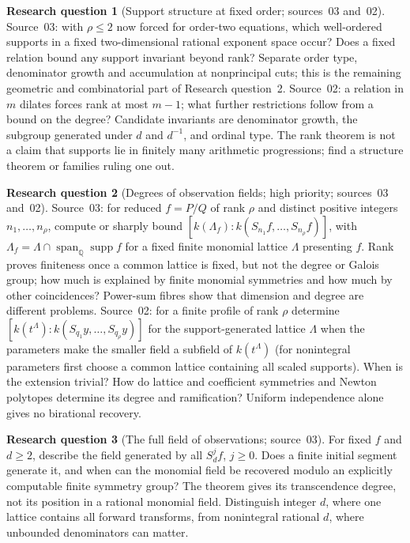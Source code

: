 \documentclass[11pt,letterpaper]{article}
\numberwithin{equation}{section}
\theoremstyle{definition}
\newtheorem{question}{Research question}
\theoremstyle{remark}
\newcommand{\Q}{\mathbb Q}
\newcommand{\supp}{\operatorname{supp}}
\begin{document}
\begin{question}[Support structure at fixed order; sources~03 and~02]
Source~03: with $\rho\le2$ now forced for order-two equations, which
well-ordered supports in a fixed two-dimensional rational exponent space occur?
Does a fixed relation bound any support invariant beyond rank? Separate order
type, denominator growth and accumulation at nonprincipal cuts; this is the
remaining geometric and combinatorial part of Research question~2. Source~02: a
relation in $m$ dilates forces rank at most $m-1$; what further restrictions
follow from a bound on the degree? Candidate invariants are denominator growth,
the subgroup generated under $d$ and $d^{-1}$, and ordinal type. The rank
theorem is not a claim that supports lie in finitely many arithmetic
progressions; find a structure theorem or families ruling one out.
\end{question}

\begin{question}[Degrees of observation fields; high priority; sources~03 and~02]
Source~03: for reduced $f=P/Q$ of rank $\rho$ and distinct positive integers
$n_1,\ldots,n_\rho$, compute or sharply bound
$[k(\Lambda_f):k(S_{n_1}f,\ldots,S_{n_\rho}f)]$, with
$\Lambda_f=\Lambda\cap\operatorname{span}_\Q\supp f$ for a fixed finite monomial
lattice $\Lambda$ presenting $f$. Rank proves finiteness once a common lattice
is fixed, but not the degree or Galois group; how much is explained by finite
monomial symmetries and how much by other coincidences? Power-sum fibres
\cite{MSW} show that dimension and degree are different problems. Source~02:
for a finite profile of rank $\rho$ determine
$[k(t^\Lambda):k(S_{q_1}y,\ldots,S_{q_\rho}y)]$ for the support-generated
lattice $\Lambda$ when the parameters make the smaller field a subfield of
$k(t^\Lambda)$ (for nonintegral parameters first choose a common lattice
containing all scaled supports). When is the extension trivial? How do lattice
and coefficient symmetries and Newton polytopes determine its degree and
ramification? Uniform independence alone gives no birational recovery.
\end{question}

\begin{question}[The full field of observations; source~03]
For fixed $f$ and $d\ge2$, describe the field generated by all $S_d^jf$,
$j\ge0$. Does a finite initial segment generate it, and when can the monomial
field be recovered modulo an explicitly computable finite symmetry group? The
theorem gives its transcendence degree, not its position in a rational monomial
field. Distinguish integer $d$, where one lattice contains all forward
transforms, from nonintegral rational $d$, where unbounded denominators can
matter.
\end{question}
\end{document}

